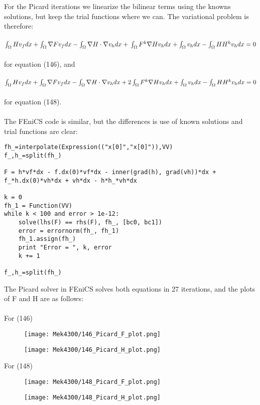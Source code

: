 \documentclass[a4paper,english,11pt,twoside]{article}
\begin{document}
\newpage
For the Picard iterations we linearize the bilinear terms using the knowns solutions, but keep the trial functions where we can. The variational problem is therefore:\\
\\
$\int_{\Omega}Hv_fdx + \int_{\Omega}\nabla F v_fdx - \int_{\Omega}\nabla H\cdot\nabla v_hdx + \\
\\
\int_{\Omega} F^k \nabla H v_hdx + \int_{\Omega}v_hdx - \int_{\Omega}H H^kv_hdx = 0$\\
\\
for equation (146), and\\
\\
$\int_{\Omega}Hv_fdx + \int_{\Omega}\nabla F v_fdx - \int_{\Omega}\nabla H\cdot\nabla v_hdx + \\
\\
2\int_{\Omega} F^k \nabla H v_hdx + \int_{\Omega}v_hdx - \int_{\Omega}H H^kv_hdx = 0$\\
\\
for equation (148).\\
\\
The FEniCS code is similar, but the differences is use of known solutions and trial functions are clear:
\begin{lstlisting}[style=python]
fh_=interpolate(Expression(("x[0]","x[0]")),VV)
f_,h_=split(fh_)

F = h*vf*dx - f.dx(0)*vf*dx - inner(grad(h), grad(vh))*dx + 
f_*h.dx(0)*vh*dx + vh*dx - h*h_*vh*dx

k = 0
fh_1 = Function(VV)
while k < 100 and error > 1e-12:
	solve(lhs(F) == rhs(F), fh_, [bc0, bc1])
	error = errornorm(fh_, fh_1)
	fh_1.assign(fh_)
	print "Error = ", k, error
	k += 1

f_,h_=split(fh_)
\end{lstlisting}
\newpage
The Picard solver in FEniCS solves both equations in 27 iterations, and the plots of F and H are as follows:\\
\\
For (146)
\begin{figure}[h!]
\texttt{[image: Mek4300/146\_Picard\_F\_plot.png]}
\end{figure}
\begin{figure}[h!]
\texttt{[image: Mek4300/146\_Picard\_H\_plot.png]}
\end{figure}

For (148)
\begin{figure}[h!]
\texttt{[image: Mek4300/148\_Picard\_F\_plot.png]}
\end{figure}
\begin{figure}[h!]
\texttt{[image: Mek4300/148\_Picard\_H\_plot.png]}
\end{figure}
\end{document}
